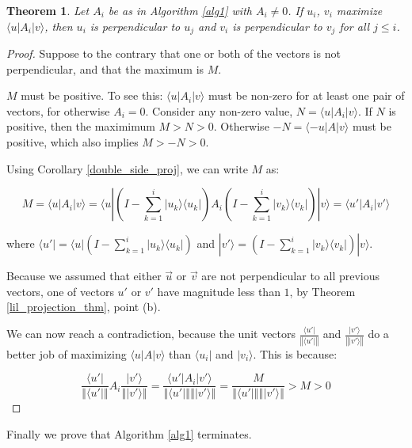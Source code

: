 \documentclass{amsbook}
\newtheorem{theorem}{Theorem}
\begin{document}
 \begin{theorem}
Let $A_i$ be as in Algorithm \ref{alg1} with $A_i\neq0$.  If $u_i$, $v_i$ maximize $\langle u |A_i| v \rangle$, then $u_i$ is perpendicular to $u_j$ and $v_i$ is perpendicular to $v_j$ for all $j\leq i$.
 \end{theorem}

\begin{proof}
\label{svd_perpendicular}
Suppose to the contrary that one or both of the vectors is not perpendicular, and that the maximum is $M$.

$M$ must be positive.  To see this:  $\langle u|A_i|v\rangle$ must be non-zero for at least one pair of vectors, for otherwise $A_i=0$.  Consider any non-zero value, $N=\langle u|A_i|v\rangle$.  If $N$ is positive, then the maximimum $M>N>0$.  Otherwise $-N=\langle -u|A|v\rangle$ must be positive, which also implies $M>-N>0$.

Using Corollary \ref{double_side_proj}, we can write $M$ as:

$$
M=\langle u |A_i| v \rangle=\langle u |\left(I-\sum_{k=1}^i| u _k\rangle\langle u _k|\right)A_i\left(I-\sum_{k=1}^{i}| v _k\rangle\langle v _k|\right)| v \rangle=\langle u '|A_i| v '\rangle
$$

where $\langle u'|=\langle u |\left(I-\sum_{k=1}^i| u _k\rangle\langle u _k|\right)$ and $|v'\rangle=\left(I-\sum_{k=1}^{i}| v _k\rangle\langle v _k|\right)| v \rangle$.

Because we assumed that either $\vec u$ or $\vec v$ are not perpendicular to all previous vectors, one of vectors $ u '$ or $ v '$ have magnitude less than $1$, by Theorem \ref{lil_projection_thm}, point (b).

We can now reach a contradiction, because the unit vectors $\frac{\langle u '|}{\left\Vert\langle u '|\right\Vert}$ and $\frac{| v '\rangle}{\left\Vert| v '\rangle\right\Vert}$ do a better job of maximizing $\langle u|A|v\rangle$ than $\langle u_i|$ and $|v_i\rangle$.  This is because:

$$
\frac{\langle u '|}{\left\Vert\langle u '|\right\Vert}A_i\frac{| v '\rangle}{\left\Vert| v '\rangle\right\Vert} = \frac{\langle u'|A_i|v'\rangle}{\left\Vert\langle u '|\right\Vert\left\Vert| v '\rangle\right\Vert} = \frac{M}{\left\Vert\langle u '|\right\Vert\left\Vert| v '\rangle\right\Vert} > M >0
$$

\end{proof}

Finally we prove that Algorithm \ref{alg1} terminates.
\end{document}
